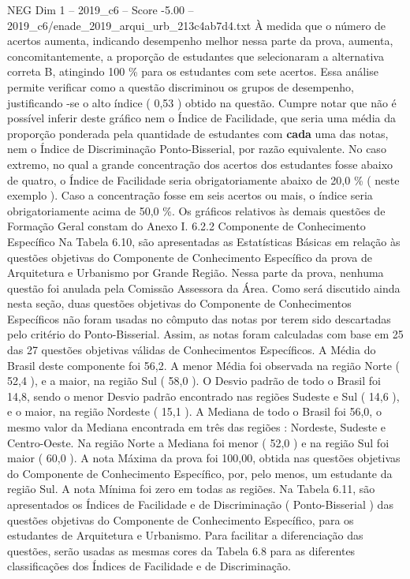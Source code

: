 \begin{textsample}{NEG Dim 1 – 2019\_c6 – Score -5.00 – 2019\_c6/enade\_2019\_arqui\_urb\_213c4ab7d4.txt}
À medida que o número de acertos aumenta, indicando desempenho melhor nessa parte da prova, aumenta, concomitantemente, a proporção de estudantes que selecionaram a alternativa correta B, atingindo 100 \% para os estudantes com sete acertos.
Essa análise permite verificar como a questão discriminou os grupos de desempenho, justificando -se o alto índice ( 0,53 ) obtido na questão.
Cumpre notar que não é possível inferir deste gráfico nem o Índice de Facilidade, que seria uma média da proporção ponderada pela quantidade de estudantes com \textbf{cada} uma das notas, nem o Índice de Discriminação Ponto-Bisserial, por razão equivalente.
No caso extremo, no qual a grande concentração dos acertos dos estudantes fosse abaixo de quatro, o Índice de Facilidade seria obrigatoriamente abaixo de 20,0 \% ( neste exemplo ).
Caso a concentração fosse em seis acertos ou mais, o índice seria obrigatoriamente acima de 50,0 \%.
Os gráficos relativos às demais questões de Formação Geral constam do Anexo I. 6.2.2 Componente de Conhecimento Específico Na Tabela 6.10, são apresentadas as Estatísticas Básicas em relação às questões objetivas do Componente de Conhecimento Específico da prova de Arquitetura e Urbanismo por Grande Região.
Nessa parte da prova, nenhuma questão foi anulada pela Comissão Assessora da Área.
Como será discutido ainda nesta seção, duas questões objetivas do Componente de Conhecimentos Específicos não foram usadas no cômputo das notas por terem sido descartadas pelo critério do Ponto-Bisserial.
Assim, as notas foram calculadas com base em 25 das 27 questões objetivas válidas de Conhecimentos Específicos.
A Média do Brasil deste componente foi 56,2.
A menor Média foi observada na região Norte ( 52,4 ), e a maior, na região Sul ( 58,0 ).
O Desvio padrão de todo o Brasil foi 14,8, sendo o menor Desvio padrão encontrado nas regiões Sudeste e Sul ( 14,6 ), e o maior, na região Nordeste ( 15,1 ).
A Mediana de todo o Brasil foi 56,0, o mesmo valor da Mediana encontrada em três das regiões : Nordeste, Sudeste e Centro-Oeste.
Na região Norte a Mediana foi menor ( 52,0 ) e na região Sul foi maior ( 60,0 ).
A nota Máxima da prova foi 100,00, obtida nas questões objetivas do Componente de Conhecimento Específico, por, pelo menos, um estudante da região Sul.
A nota Mínima foi zero em todas as regiões.
Na Tabela 6.11, são apresentados os Índices de Facilidade e de Discriminação ( Ponto-Bisserial ) das questões objetivas do Componente de Conhecimento Específico, para os estudantes de Arquitetura e Urbanismo.
Para facilitar a diferenciação das questões, serão usadas as mesmas cores da Tabela 6.8 para as diferentes classificações dos Índices de Facilidade e de Discriminação.

\end{textsample}
